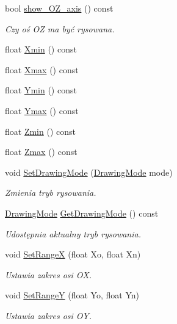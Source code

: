 \begin{DoxyCompactItemize}
bool \hyperlink{class_pz_g_1_1_gnuplot_link_ab8f4938d56867a42b14f190a5000f8c8}{show\+\_\+\+O\+Z\+\_\+axis} () const
\begin{DoxyCompactList}\small\item\em Czy oś OZ ma być rysowana. \end{DoxyCompactList}\item 
float \hyperlink{class_pz_g_1_1_gnuplot_link_a8817b7aee867b4ebdf493a091a32bad0}{Xmin} () const
\item 
float \hyperlink{class_pz_g_1_1_gnuplot_link_a4211e715251f1f90e56f5ec64c672d64}{Xmax} () const
\item 
float \hyperlink{class_pz_g_1_1_gnuplot_link_a9a8112464c85c3a72723079c84446789}{Ymin} () const
\item 
float \hyperlink{class_pz_g_1_1_gnuplot_link_a7311b56e882f8bf334c1afbceb51a734}{Ymax} () const
\item 
float \hyperlink{class_pz_g_1_1_gnuplot_link_a3d360b728e1c4d550f7e7253751e0f0a}{Zmin} () const
\item 
float \hyperlink{class_pz_g_1_1_gnuplot_link_a2705f7ee3528734ddcd28f2b8de9af0d}{Zmax} () const
\item 
void \hyperlink{class_pz_g_1_1_gnuplot_link_a5b903bc69eb4c2884edbe25d53cea188}{Set\+Drawing\+Mode} (\hyperlink{namespace_pz_g_a4360c76a1dbf714a19a0d97fe56e0660}{Drawing\+Mode} mode)
\begin{DoxyCompactList}\small\item\em Zmienia tryb rysowania. \end{DoxyCompactList}\item 
\hyperlink{namespace_pz_g_a4360c76a1dbf714a19a0d97fe56e0660}{Drawing\+Mode} \hyperlink{class_pz_g_1_1_gnuplot_link_acbeb26baf4b1091dd9243d9cdba8f612}{Get\+Drawing\+Mode} () const
\begin{DoxyCompactList}\small\item\em Udostępnia aktualny tryb rysowania. \end{DoxyCompactList}\item 
void \hyperlink{class_pz_g_1_1_gnuplot_link_a7db1d889cd30bfb23cb4af3ca4bb4ef0}{Set\+RangeX} (float Xo, float Xn)
\begin{DoxyCompactList}\small\item\em Ustawia zakres osi {\itshape OX}. \end{DoxyCompactList}\item 
void \hyperlink{class_pz_g_1_1_gnuplot_link_a269f721e7d49c37a842c1f65511a7d71}{Set\+RangeY} (float Yo, float Yn)
\begin{DoxyCompactList}\small\item\em Ustawia zakres osi {\itshape OY}. \end{DoxyCompactList}\item 

\end{DoxyCompactItemize}
